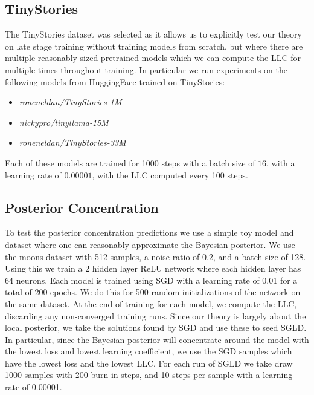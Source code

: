 \documentclass{article} %
\theoremstyle{definition}
\begin{document}
\subsection{TinyStories}
The TinyStories dataset \citep{eldan2023tinystoriessmalllanguagemodels} was selected as it allows us to explicitly test our theory on late stage training without training models from scratch, but where there are multiple reasonably sized pretrained models which we can compute the LLC for multiple times throughout training. In particular we run experiments on the following models from HuggingFace trained on TinyStories: 
\begin{itemize}
    \item \textit{roneneldan/TinyStories-1M} \citep{huggingfaceRoneneldanTinyStories1MHugging}
    \item \textit{nickypro/tinyllama-15M} \citep{huggingfaceNickyprotinyllama15MHugging}
    \item \textit{roneneldan/TinyStories-33M} \citep{huggingfaceRoneneldanTinyStories33MHugging}
\end{itemize}
Each of these models are trained for 1000 steps with a batch size of $16$, with a learning rate of $0.00001$, with the LLC computed every 100 steps.

\subsection{Posterior Concentration}
To test the posterior concentration predictions we use a simple toy model and dataset where one can reasonably approximate the Bayesian posterior. We use the moons dataset \citep{scikit-learn} with 512 samples, a noise ratio of 0.2, and a batch size of 128. Using this we train a 2 hidden layer ReLU network where each hidden layer has 64 neurons. Each model is trained using SGD with a learning rate of 0.01 for a total of 200 epochs. We do this for 500 random initializations of the network on the same dataset. At the end of training for each model, we compute the LLC, discarding any non-converged training runs. Since our theory is largely about the local posterior, we take the solutions found by SGD and use these to seed SGLD. In particular, since the Bayesian posterior will concentrate around the model with the lowest loss and lowest learning coefficient, we use the SGD samples which have the lowest loss and the lowest LLC. For each run of SGLD we take draw 1000 samples with 200 burn in steps, and 10 steps per sample with a learning rate of 0.00001.
\end{document}
